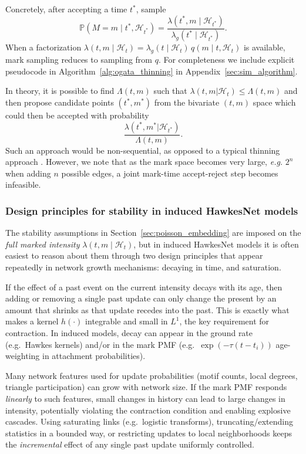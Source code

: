 \documentclass[12pt]{article}
\begin{document}
Concretely, after accepting a time $t^*$, sample
\[
\mathbb P(M=m\mid t^*,\mathcal H_{t^*})=\frac{\lambda(t^*,m\mid\mathcal H_{t^*})}{\lambda_g(t^*\mid\mathcal H_{t^*})}.
\]
When a factorization $\lambda(t,m\mid\mathcal H_t)=\lambda_g(t\mid\mathcal H_t)\,q(m\mid t,\mathcal H_t)$ is available, mark sampling reduces to sampling from $q$. For completeness we include explicit pseudocode in Algorithm~\ref{alg:ogata_thinning} in Appendix~\ref{sec:sim_algorithm}.






In theory, it is possible to find $\Lambda(t,m)$ such that $\lambda(t,m|\mathcal{H}_t)\leq \Lambda(t,m)$ and then propose candidate points $(t^*,m^*)$ from the bivariate $(t,m)$ space which could then be accepted with probability $$\frac{\lambda(t^*,m^*|\mathcal{H}_{t^*})}{\Lambda(t,m)}.$$ Such an approach would be non-sequential, as opposed to a typical thinning approach \citep{moller2010thinning}. However, we note that as the mark space becomes very large, \textit{e.g.} $2^{n}$ when adding $n$ possible edges, a joint mark-time accept-reject step becomes infeasible.

\subsubsection{Design principles for stability in induced HawkesNet models}

The stability assumptions in Section~\ref{sec:poisson_embedding} are imposed on the \emph{full marked intensity} $\lambda(t,m\mid\mathcal H_t)$, but in induced HawkesNet models it is often easiest to reason about them through two design principles that appear repeatedly in network growth mechanisms: decaying in time, and saturation. 

If the effect of a past event on the current intensity decays with its age, then adding or removing a single past update can only change the present by an amount that shrinks as that update recedes into the past. This is exactly what makes a kernel $h(\cdot)$ integrable and small in $L^1$, the key requirement for contraction. In induced models, decay can appear in the ground rate (e.g.\ Hawkes kernels) and/or in the mark PMF (e.g.\ $\exp(-\tau(t-t_i))$ age-weighting in attachment probabilities).

Many network features used for update probabilities (motif counts, local degrees, triangle participation) can grow with network size. If the mark PMF responds \emph{linearly} to such features, small changes in history can lead to large changes in intensity, potentially violating the contraction condition and enabling explosive cascades. Using saturating links (e.g.\ logistic transforms), truncating/extending statistics in a bounded way, or restricting updates to local neighborhoods keeps the \emph{incremental} effect of any single past update uniformly controlled.
\end{document}
